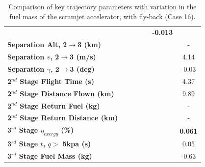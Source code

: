 \begin{table}[ht]
\begin{tabular}{l c c c c c c}
	& \textbf{\secondExergyEffmFuelNinetyFive}
	& \textbf{\secondExergyEffmFuelStandard}
	& \textbf{\secondExergyEffmFuelOneHundredFive}
	& \textbf{\secondExergyEffmFuelOneHundredTen}
	& \textbf{-0.013}
	\\
	\textbf{Separation Alt, 2$\rightarrow$3 (km)}
	& \secondthirdSeparationAltmFuelNinety
	& \secondthirdSeparationAltmFuelNinetyFive
	& \secondthirdSeparationAltmFuelStandard
	& \secondthirdSeparationAltmFuelOneHundredFive
	& \secondthirdSeparationAltmFuelOneHundredTen
	& -
	\\
	\textbf{Separation $v$, 2$\rightarrow$3 (m/s)}
	& \secondthirdSeparationvmFuelNinety
	& \secondthirdSeparationvmFuelNinetyFive
	& \secondthirdSeparationvmFuelStandard
	& \secondthirdSeparationvmFuelOneHundredFive
	& \secondthirdSeparationvmFuelOneHundredTen
	&4.14
	\\
	\textbf{Separation $\gamma$, 2$\rightarrow$3 (deg)}
	& \secondthirdSeparationgammamFuelNinety
	& \secondthirdSeparationgammamFuelNinetyFive
	& \secondthirdSeparationgammamFuelStandard
	& \secondthirdSeparationgammamFuelOneHundredFive
	& \secondthirdSeparationgammamFuelOneHundredTen
	&-0.03
	\\
	\textbf{2$^{nd}$ Stage Flight Time (s)}
	& \secondFlightTimemFuelNinety
	& \secondFlightTimemFuelNinetyFive
	& \secondFlightTimemFuelStandard
	& \secondFlightTimemFuelOneHundredFive
	& \secondFlightTimemFuelOneHundredTen
	&4.37
	\\
	\textbf{2$^{nd}$ Stage Distance Flown (km)}
	& \SecondDistmFuelNinety
	& \SecondDistmFuelNinetyFive
	& \SecondDistmFuelStandard
	& \SecondDistmFuelOneHundredFive
	& \SecondDistmFuelOneHundredTen
	&9.89
	\\
	\textbf{2$^{nd}$ Stage Return Fuel (kg)}
	& \returnFuelmFuelNinety
	& \returnFuelmFuelNinetyFive
	& \returnFuelmFuelStandard
	& \returnFuelmFuelOneHundredFive
	& \returnFuelmFuelOneHundredTen
	& -
	\\
	\textbf{2$^{nd}$ Stage Return Distance (km)}
	& \returnDistmFuelNinety
	& \returnDistmFuelNinetyFive
	& \returnDistmFuelStandard
	& \returnDistmFuelOneHundredFive
	& \returnDistmFuelOneHundredTen
	& -
	\\
	\hline 
	\textbf{3$^{rd}$ Stage $\eta_{exergy}$ (\%)}
	& \textbf{\thirddExergyEffmFuelNinety}
	& \textbf{\thirddExergyEffmFuelNinetyFive}
	& \textbf{\thirddExergyEffmFuelStandard}
	& \textbf{\thirddExergyEffmFuelOneHundredFive}
	& \textbf{\thirddExergyEffmFuelOneHundredTen}
	& \textbf{0.061}
	\\
	\textbf{3$^{rd}$ Stage $t$, $q >$ 5kpa (s)}
	& \thirdqOverFivemFuelNinety
	& \thirdqOverFivemFuelNinetyFive
	& \thirdqOverFivemFuelStandard
	& \thirdqOverFivemFuelOneHundredFive
	& \thirdqOverFivemFuelOneHundredTen
	&0.05
	\\
	\textbf{3$^{rd}$ Stage Fuel Mass (kg)}
	& \thirdmFuelmFuelNinety
	& \thirdmFuelmFuelNinetyFive
	& \thirdmFuelmFuelStandard
	& \thirdmFuelmFuelOneHundredFive
	& \thirdmFuelmFuelOneHundredTen
	&-0.63
	\\
	\hline 
\end{tabular} 
\caption{Comparison of key trajectory parameters with variation in the fuel mass of the scramjet accelerator, with fly-back (Case 16).}
\label{tab:comparison111}
\end{table}
